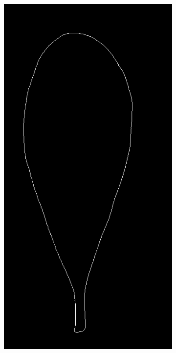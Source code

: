 \begin{frame}
\begin{figure}[ht!]
\begin{subfigure}[b]{0.19\textwidth}
	\end{subfigure}
	\begin{subfigure}[b]{0.19\textwidth}
		\centering
		\includegraphics[width=\textwidth]{img/contour.jpg}

\end{subfigure}
\end{figure}
\end{frame}
